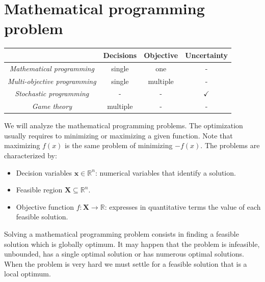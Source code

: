 \documentclass[12pt, a4paper]{report}
\begin{document}
    \section{Mathematical programming problem}
    \begin{table}[H]
        \centering
        \begin{tabular}{c|ccc|}
        \cline{2-4}
                                                                   & \textbf{Decisions} & \textbf{Objective} & \textbf{Uncertainty} \\ \hline
        \multicolumn{1}{|c|}{\textit{Mathematical programming}}    & single                   & one                          & -                    \\
        \multicolumn{1}{|c|}{\textit{Multi-objective programming}} & single                   & multiple                     & -                    \\
        \multicolumn{1}{|c|}{\textit{Stochastic programming}}      & -                        & -                            & $\checkmark$         \\
        \multicolumn{1}{|c|}{\textit{Game theory}}                 & multiple                 & -                            & -                    \\ \hline
        \end{tabular}
    \end{table}
    We will analyze the mathematical programming problems. 
    The optimization usually requires to minimizing or maximizing a given function. 
    Note that maximizing $f(x)$ is the same problem of minimizing $-f(x)$. The problems are characterized by: 
    \begin{itemize}
        \item Decision variables $\boldsymbol{x} \in \mathbb{R}^n$: numerical variables that identify a solution. 
        \item Feasible region $\boldsymbol{X} \subseteq \mathbb{R}^n$.
        \item Objective function $f:\boldsymbol{X} \rightarrow\mathbb{R}$: expresses in quantitative terms the value of each feasible solution. 
    \end{itemize}
    Solving a mathematical programming problem consists in finding a feasible solution which is globally optimum. It may happen that the problem is infeasible, unbounded, has a single 
    optimal solution or has numerous optimal solutions. 
    When the problem is very hard we must settle for a feasible solution that is a local optimum. 
    
\end{document}
